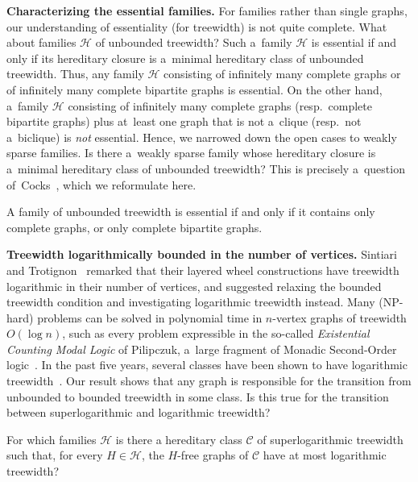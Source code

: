 \medskip

\textbf{Characterizing the essential families.}
For families rather than single graphs, our understanding of essentiality (for treewidth) is not quite complete.
What about families $\mathcal H$ of unbounded treewidth?
Such a~family $\mathcal H$ is essential if and only if its hereditary closure is a~minimal hereditary class of unbounded treewidth.
Thus, any family $\mathcal H$ consisting of infinitely many complete graphs or of infinitely many complete bipartite graphs is essential.
On the other hand, a~family $\mathcal H$ consisting of infinitely many complete graphs (resp.~complete bipartite graphs) plus at~least one graph that is not a~clique (resp.~not a~biclique) is \emph{not} essential.
Hence, we narrowed down the open cases to weakly sparse families.
Is there a~weakly sparse family whose hereditary closure is a~minimal hereditary class of unbounded treewidth?
This is precisely a~question of~Cocks~\cite{COCKS2024104005}, which we reformulate here.

\begin{conjecture}
    A family of unbounded treewidth is essential if and only if it contains only complete graphs, or only complete bipartite graphs. 
\end{conjecture}

\medskip

\textbf{Treewidth logarithmically bounded in the number of vertices.}
Sintiari and Trotignon~\cite{layered-1} remarked that their layered wheel constructions have treewidth logarithmic in their number of vertices, and suggested relaxing the bounded treewidth condition and investigating logarithmic treewidth instead. 
Many (NP-hard) problems can be solved in polynomial time in $n$-vertex graphs of treewidth $O(\log n)$, such as every problem expressible in the so-called \emph{Existential Counting Modal Logic} of Pilipczuk, a~large fragment of Monadic Second-Order logic~\cite{Pilipczuk11}.
In the past five years, several classes have been shown to have logarithmic treewidth~\cite{Chudnovsky_2022, Bonamy24, BonnetD23, chudnovsky2024inducedsubgraphstreedecompositions, sparseOuterString}.
Our result shows that any graph is responsible for the transition from unbounded to bounded treewidth in some class.
Is this true for the transition between superlogarithmic and logarithmic treewidth? 

\begin{problem}\label{p:logarithmic-tw}
    For which families $\mathcal H$ is there a hereditary class $\mathcal C$ of superlogarithmic treewidth such that, for every $H \in \mathcal H$, the $H$-free graphs of $\mathcal C$ have at most logarithmic treewidth?
\end{problem}

